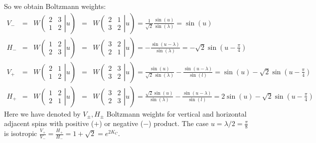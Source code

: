\documentclass[12pt]{article}
\begin{document}
So we obtain Boltzmann weights:
\begin{equation}
  \label{eq:9}
  \begin{array}{lllll}
    V_{-} &=& W\left.\left(
    \begin{array}{ll}
      2 & 3\\
      1 & 2
    \end{array}\right| u \right) &=&   W\left.\left(
    \begin{array}{ll}
      2 & 1\\
      3 & 2
    \end{array}\right| u
\right)=\frac{1}{\sqrt{2}} \frac{\sin(u)}{\sin(\lambda)}=\sin(u)\\
H_{-}&=&W\left.\left(
    \begin{array}{ll}
      1 & 2\\
      2 & 3
    \end{array}\right| u\right) &=&  W\left.\left(
    \begin{array}{ll}
      3 & 2\\
      2 & 1
    \end{array}\right| u
\right)=-\frac{\sin(u-\lambda)}{\sin(\lambda)}=-\sqrt{2}\sin\left(u-\frac{\pi}{4}\right)\\

V_{+}&=&W\left.\left(
    \begin{array}{ll}
      2 & 1\\
      1 & 2
    \end{array}\right| u
\right)&=&   W\left.\left(
    \begin{array}{ll}
      2 & 3\\
      3 & 2
    \end{array}\right| u
\right)= \frac{\sin\left( u\right) }{\sqrt{2}\,\sin\left(
    \lambda\right) }-\frac{\sin\left( u-\lambda\right) }{\sin\left(
    l\right) } = \sin(u)-\sqrt{2}\sin\left(u-\frac{\pi}{4}\right)\\
H_{+}&=&W\left.\left(
    \begin{array}{ll}
      1 & 2\\
      2 & 1
    \end{array}\right| u
\right)&=&   W\left.\left(
    \begin{array}{ll}
      3 & 2\\
      2 & 3
    \end{array}\right| u
\right)= \frac{\sqrt{2}\sin\left( u\right) }{\sin\left(
    \lambda\right) }-\frac{\sin\left( u-\lambda\right) }{\sin\left(
    l\right) } = 2\sin(u)-\sqrt{2}\sin\left(u-\frac{\pi}{4}\right)
\end{array}
\end{equation}
Here we have denoted by $V_{\pm}, H_{\pm}$ Boltzmann weights for
vertical and horizontal adjacent spins with positive ($+$) or negative
($-$) product. The case $u=\lambda/2=\frac{\pi}{8}$ is isotropic
$\frac{V_+}{V_-}=\frac{H_+}{H_-}= 1+\sqrt{2}=e^{2 K_C}$.
\end{document}
